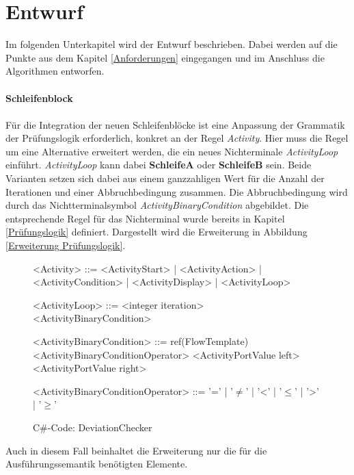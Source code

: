     \section{Entwurf}
    Im folgenden Unterkapitel wird der Entwurf beschrieben.
    Dabei werden auf die Punkte aus dem Kapitel \ref{Anforderungen} eingegangen und im Anschluss die Algorithmen entworfen.\\
    \\
    \textbf{Schleifenblock}\\
    \\
    Für die Integration der neuen Schleifenblöcke ist eine Anpassung der Grammatik der Prüfungslogik erforderlich, konkret an der Regel \textit{Activity}.    
    Hier muss die Regel um eine Alternative erweitert werden, die ein neues Nichterminale \textit{ActivityLoop} einführt.
    \textit{ActivityLoop} kann dabei \textbf{SchleifeA} oder \textbf{SchleifeB} sein.
    Beide Varianten setzen sich dabei aus einem ganzzahligen Wert für die Anzahl der Iterationen und einer Abbruchbedingung zusammen.
    Die Abbruchbedingung wird durch das Nichtterminalsymbol \textit{ActivityBinaryCondition} abgebildet.
    Die entsprechende Regel für das Nichterminal wurde bereits in Kapitel \ref{Prüfungslogik} definiert.
    Dargestellt wird die Erweiterung in Abbildung \ref{Erweiterung Prüfungslogik}.
    \begin{figure}[H]
        \centering
        \begin{grammar}
            <Activity> ::= <ActivityStart>
            | <ActivityAction>
            | <ActivityCondition>
            | <ActivityDisplay>
            | <ActivityLoop>
    
            <ActivityLoop> ::= <integer iteration> <ActivityBinaryCondition>
    
            <ActivityBinaryCondition> ::= ref(FlowTemplate) <ActivityBinaryConditionOperator> <ActivityPortValue left> <ActivityPortValue right>
    
            <ActivityBinaryConditionOperator> ::= '='
            | '$\neq$' 
            | '\textless' 
            | '$\leq$' 
            | '\textgreater' 
            | '$\geq$'
        \end{grammar}        
        \caption{C\#-Code: DeviationChecker}
    \end{figure}
    Auch in diesem Fall beinhaltet die Erweiterung nur die für die Ausführungssemantik benötigten Elemente.\\
